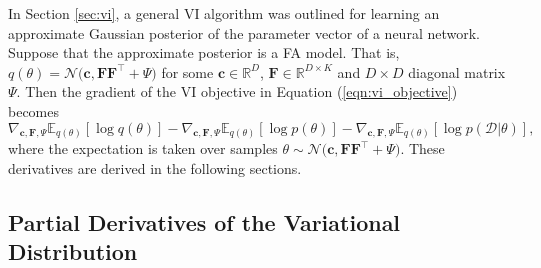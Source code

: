 \documentclass[msc,deptreport.inf]{infthesis} %
\newcommand{\matr}[1]{\mathbf{#1}}
\newcommand{\R}{\mathbb R}
\newcommand{\E}{\mathbb E}
\begin{document}
In Section \ref{sec:vi}, a general VI algorithm was outlined for learning an approximate Gaussian posterior of the parameter vector of a neural network. Suppose that the approximate posterior is a FA model. That is, $q(\theta) = \mathcal{N}\big(\matr{c}, \matr{FF}^{\intercal} + \Psi\big)$ for some $\matr{c} \in \R^D$, $\matr{F} \in \R^{D \times K}$ and $D \times D$ diagonal matrix $\Psi$. Then the gradient of the VI objective in Equation (\ref{eqn:vi_objective}) becomes 
\begin{equation}\label{eqn:vi_fa_derivatives}
	\nabla_{\matr{c}, \matr{F}, \Psi} \E_{q(\theta)} [\log q(\theta)]
	- \nabla_{\matr{c}, \matr{F}, \Psi} \E_{q(\theta)} [\log p(\theta)]
	-  \nabla_{\matr{c}, \matr{F}, \Psi} \E_{q(\theta)} [\log p(\mathcal{D} | \theta)],
\end{equation}
where the expectation is taken over samples $\theta \sim \mathcal{N}\big(\matr{c}, \matr{FF}^{\intercal} + \Psi\big)$. These derivatives are derived in the following sections. 


\subsection{Partial Derivatives of the Variational Distribution}
\end{document}
